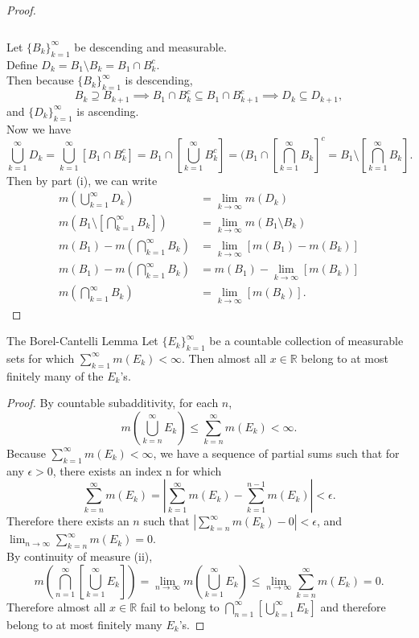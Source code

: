 \begin{flushleft}
\begin{proof}
\begin{align*}
		\end{align*}
		\\Let $\{B_k\}_{k=1}^\infty$ be descending and measurable.\\
		Define $D_k=B_1\setminus B_k=B_1\cap B_k^c$.\\
		Then because $\{B_k\}_{k=1}^\infty$ is descending, 
		\[
			B_k\supseteq B_{k+1}\implies B_1\cap B_k^c\subseteq B_1\cap B_{k+1}^c\implies D_k\subseteq D_{k+1},
		\]
		and $\{D_k\}_{k=1}^\infty$ is ascending.\\
		Now we have
		\[
			\bigcup_{k=1}^\infty D_k=\bigcup_{k=1}^\infty [B_1\cap B_k^c]=B_1\cap[\bigcup_{k=1}^\infty  B_k^c]=(B_1\cap[\bigcap_{k=1}^\infty  B_k]^c=B_1\setminus[\bigcap_{k=1}^\infty  B_k].
		\]
		Then by part (i), we can write
		\begin{align*}
			m(\bigcup_{k=1}^\infty D_k)&=\lim_{k\to\infty}m(D_k)\\
			m(B_1\setminus[\bigcap_{k=1}^\infty  B_k])&=\lim_{k\to\infty}m(B_1\setminus B_k)\\
			m(B_1)-m(\bigcap_{k=1}^\infty  B_k)&=\lim_{k\to\infty}[m(B_1)-m( B_k)]\\
			m(B_1)-m(\bigcap_{k=1}^\infty  B_k)&=m(B_1)-\lim_{k\to\infty}[m( B_k)]\\
			m(\bigcap_{k=1}^\infty  B_k)&=\lim_{k\to\infty}[m( B_k)].
		\end{align*}
	\end{proof}
	\begin{namedthm*}{The Borel-Cantelli Lemma}
		Let $\{E_k\}_{k=1}^\infty$ be a countable collection of measurable sets for which $\sum_{k=1}^\infty m(E_k)<\infty$.
		Then almost all $x\in\mathbb{R}$ belong to at most finitely many of the $E_k$'s.
	\end{namedthm*}
	\begin{proof}
		By countable subadditivity, for each $n$,
		\[
			m(\bigcup_{k=n}^\infty E_k)\le\sum_{k=n}^\infty m(E_k)<\infty.
		\]
		Because $\sum_{k=1}^\infty m(E_k)<\infty$, we have a sequence of partial sums such that for any $\epsilon>0$, there exists an index n for which 
		\[
			\sum_{k=n}^\infty m(E_k)=|\sum_{k=1}^\infty m(E_k)-\sum_{k=1}^{n-1} m(E_k)|<\epsilon.
		\] 
		Therefore there exists an $n$ such that $|\sum_{k=n}^\infty m(E_k)-0|<\epsilon$, and $\lim_{n\to\infty}\sum_{k=n}^\infty m(E_k)=0$.\\
		By continuity of measure (ii),
		\[
			m(\bigcap_{n=1}^\infty[\bigcup_{k=1}^\infty E_k])=\lim_{n\to\infty}m(\bigcup_{k=1}^\infty E_k)\le\lim_{n\to\infty}\sum_{k=n}^\infty m(E_k)=0.
		\]
		Therefore almost all $x\in\mathbb{R}$ fail to belong to $\bigcap_{n=1}^\infty[\bigcup_{k=1}^\infty E_k]$ and therefore belong to at most finitely many $E_k$'s.

\end{proof}
\end{flushleft}
